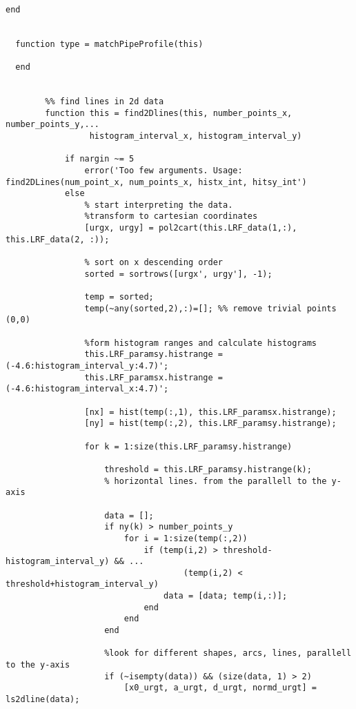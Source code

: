\begin{lstlisting}
            
end
 
  
  function type = matchPipeProfile(this)
            
  end
        
        
        %% find lines in 2d data
        function this = find2Dlines(this, number_points_x, number_points_y,...
                 histogram_interval_x, histogram_interval_y)
            
            if nargin ~= 5
                error('Too few arguments. Usage: find2DLines(num_point_x, num_points_x, histx_int, hitsy_int')
            else
                % start interpreting the data.
                %transform to cartesian coordinates
                [urgx, urgy] = pol2cart(this.LRF_data(1,:), this.LRF_data(2, :));
                
                % sort on x descending order
                sorted = sortrows([urgx', urgy'], -1);
                
                temp = sorted;
                temp(~any(sorted,2),:)=[]; %% remove trivial points (0,0)
                
                %form histogram ranges and calculate histograms
                this.LRF_paramsy.histrange = (-4.6:histogram_interval_y:4.7)';
                this.LRF_paramsx.histrange = (-4.6:histogram_interval_x:4.7)';
                
                [nx] = hist(temp(:,1), this.LRF_paramsx.histrange);
                [ny] = hist(temp(:,2), this.LRF_paramsy.histrange);
                
                for k = 1:size(this.LRF_paramsy.histrange)
                    
                    threshold = this.LRF_paramsy.histrange(k);
                    % horizontal lines. from the parallell to the y-axis
                    
                    data = [];
                    if ny(k) > number_points_y
                        for i = 1:size(temp(:,2))
                            if (temp(i,2) > threshold-histogram_interval_y) && ...
                                    (temp(i,2) < threshold+histogram_interval_y)
                                data = [data; temp(i,:)];
                            end
                        end
                    end
                    
                    %look for different shapes, arcs, lines, parallell to the y-axis
                    if (~isempty(data)) && (size(data, 1) > 2)
                        [x0_urgt, a_urgt, d_urgt, normd_urgt] = ls2dline(data);
                        

\end{lstlisting}
